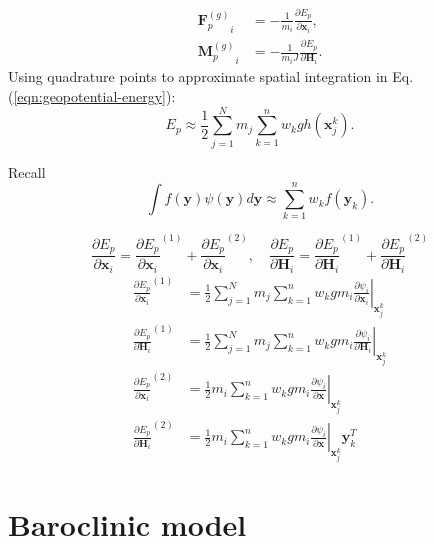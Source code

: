 \documentclass[slidestop,compress,mathserif]{beamer}
\begin{document}
\begin{frame}
  \begin{align}
    {\mathbf{F}_p^{(g)}}_i & = - \frac{1}{m_i} \frac{\partial E_p}{\partial \mathbf{x}_i}, \\
    {\mathbf{M}_p^{(g)}}_i & = - \frac{1}{m_i J} \frac{\partial E_p}{\partial \mathbf{H}_i}.
  \end{align}
  Using quadrature points to approximate spatial integration in Eq. (\ref{eqn:geopotential-energy}):
  \begin{equation}
    E_p \approx \frac{1}{2} \sum_{j = 1}^{N} m_j \sum_{k = 1}^{n} w_k g h(\mathbf{x}_j^k).
  \end{equation}
  \begin{exampleblock}{Recall}
    \begin{equation*}
      \int{f(\mathbf{y}) \psi(\mathbf{y}) d\mathbf{y}} \approx \sum_{k = 1}^{n} w_k f(\mathbf{y}_k).
    \end{equation*}
  \end{exampleblock}
\end{frame}

\begin{frame}
  \begin{equation*}
    \frac{\partial E_p}{\partial \mathbf{x}_i} = {\frac{\partial E_p}{\partial \mathbf{x}_i}}^{(1)} + {\frac{\partial E_p}{\partial \mathbf{x}_i}}^{(2)}, \quad
    \frac{\partial E_p}{\partial \mathbf{H}_i} = {\frac{\partial E_p}{\partial \mathbf{H}_i}}^{(1)} + {\frac{\partial E_p}{\partial \mathbf{H}_i}}^{(2)}
  \end{equation*}
  \begin{align}
    {\frac{\partial E_p}{\partial \mathbf{x}_i}}^{(1)} & = \frac{1}{2} \sum_{j = 1}^{N} m_j \sum_{k = 1}^{n} w_k g m_i \left.\frac{\partial \psi_i}{\partial \mathbf{x}_i}\right|_{\mathbf{x}_j^k} \\
    {\frac{\partial E_p}{\partial \mathbf{H}_i}}^{(1)} & = \frac{1}{2} \sum_{j = 1}^{N} m_j \sum_{k = 1}^{n} w_k g m_i \left.\frac{\partial \psi_i}{\partial \mathbf{H}_i}\right|_{\mathbf{x}_j^k} \\
    {\frac{\partial E_p}{\partial \mathbf{x}_i}}^{(2)} & = \frac{1}{2} m_i \sum_{k = 1}^{n} w_k g m_i \left.\frac{\partial \psi_i}{\partial \mathbf{x}}\right|_{\mathbf{x}_j^k} \\
    {\frac{\partial E_p}{\partial \mathbf{H}_i}}^{(2)} & = \frac{1}{2} m_i \sum_{k = 1}^{n} w_k g m_i \left.\frac{\partial \psi_i}{\partial \mathbf{x}}\right|_{\mathbf{x}_j^k} \mathbf{y}_k^T
  \end{align}
\end{frame}

\section{Baroclinic model}
\label{sec:Baroclinic model}

\begin{frame}

\end{frame}
\end{document}
